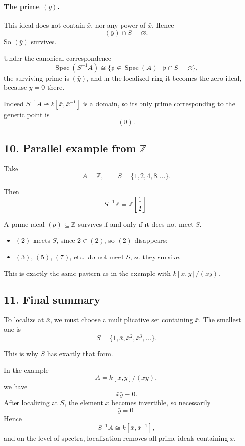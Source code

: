 \documentclass[12pt,a4paper]{article}
\theoremstyle{notespace}
\DeclareMathOperator{\Spec}{Spec}
\begin{document}
\paragraph{The prime \((\bar y)\).}
This ideal does not contain \(\bar x\), nor any power of \(\bar x\). Hence
\[
(\bar y)\cap S=\varnothing.
\]
So \((\bar y)\) survives.

Under the canonical correspondence
\[
\Spec(S^{-1}A)\cong
\{\mathfrak p\in\Spec(A)\mid \mathfrak p\cap S=\varnothing\},
\]
the surviving prime is \((\bar y)\), and in the localized ring it becomes the zero ideal, because \(\bar y=0\) there.

Indeed \(S^{-1}A\cong k[\bar x,\bar x^{-1}]\) is a domain, so its only prime corresponding to the generic point is
\[
(0).
\]

\subsection{10. Parallel example from \(\mathbb Z\)}

Take
\[
A=\mathbb Z,
\qquad
S=\{1,2,4,8,\dots\}.
\]

Then
\[
S^{-1}\mathbb Z=\mathbb Z\!\left[\frac12\right].
\]

A prime ideal \((p)\subseteq\mathbb Z\) survives if and only if it does not meet \(S\).

\begin{itemize}
	\item \((2)\) meets \(S\), since \(2\in (2)\), so \((2)\) disappears;
	\item \((3)\), \((5)\), \((7)\), etc.\ do not meet \(S\), so they survive.
\end{itemize}

This is exactly the same pattern as in the example with \(k[x,y]/(xy)\).

\subsection{11. Final summary}

To localize at \(\bar x\), we must choose a multiplicative set containing \(\bar x\). The smallest one is
\[
S=\{1,\bar x,\bar x^2,\bar x^3,\dots\}.
\]

This is why \(S\) has exactly that form.

In the example
\[
A=k[x,y]/(xy),
\]
we have
\[
\bar x\bar y=0.
\]
After localizing at \(S\), the element \(\bar x\) becomes invertible, so necessarily
\[
\bar y=0.
\]
Hence
\[
S^{-1}A\cong k[\bar x,\bar x^{-1}],
\]
and on the level of spectra, localization removes all prime ideals containing \(\bar x\).
\end{document}
